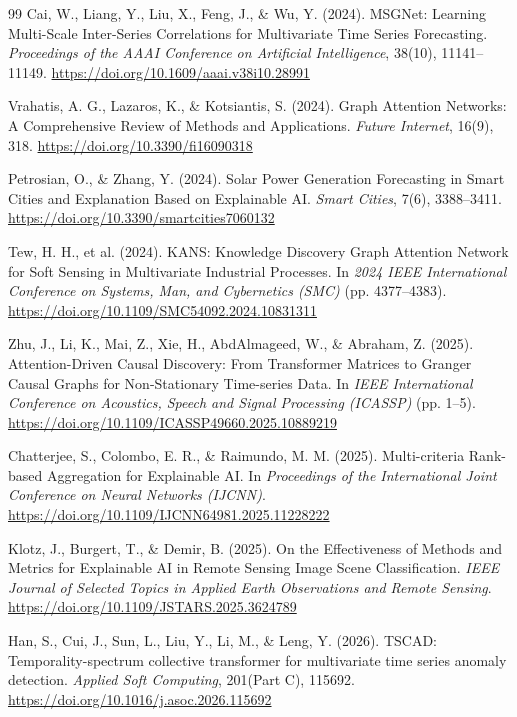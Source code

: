 \begin{thebibliography}{99}
 Cai, W., Liang, Y., Liu, X., Feng, J., \& Wu, Y. (2024). MSGNet: Learning Multi-Scale Inter-Series Correlations for Multivariate Time Series Forecasting. \emph{Proceedings of the AAAI Conference on Artificial Intelligence}, 38(10), 11141--11149. \url{https://doi.org/10.1609/aaai.v38i10.28991}

 Vrahatis, A. G., Lazaros, K., \& Kotsiantis, S. (2024). Graph Attention Networks: A Comprehensive Review of Methods and Applications. \emph{Future Internet}, 16(9), 318. \url{https://doi.org/10.3390/fi16090318}

 Petrosian, O., \& Zhang, Y. (2024). Solar Power Generation Forecasting in Smart Cities and Explanation Based on Explainable AI. \emph{Smart Cities}, 7(6), 3388--3411. \url{https://doi.org/10.3390/smartcities7060132}

 Tew, H. H., et al. (2024). KANS: Knowledge Discovery Graph Attention Network for Soft Sensing in Multivariate Industrial Processes. In \emph{2024 IEEE International Conference on Systems, Man, and Cybernetics (SMC)} (pp. 4377--4383). \url{https://doi.org/10.1109/SMC54092.2024.10831311}

 Zhu, J., Li, K., Mai, Z., Xie, H., AbdAlmageed, W., \& Abraham, Z. (2025). Attention-Driven Causal Discovery: From Transformer Matrices to Granger Causal Graphs for Non-Stationary Time-series Data. In \emph{IEEE International Conference on Acoustics, Speech and Signal Processing (ICASSP)} (pp. 1--5). \url{https://doi.org/10.1109/ICASSP49660.2025.10889219}

 Chatterjee, S., Colombo, E. R., \& Raimundo, M. M. (2025). Multi-criteria Rank-based Aggregation for Explainable AI. In \emph{Proceedings of the International Joint Conference on Neural Networks (IJCNN)}. \url{https://doi.org/10.1109/IJCNN64981.2025.11228222}

 Klotz, J., Burgert, T., \& Demir, B. (2025). On the Effectiveness of Methods and Metrics for Explainable AI in Remote Sensing Image Scene Classification. \emph{IEEE Journal of Selected Topics in Applied Earth Observations and Remote Sensing}. \url{https://doi.org/10.1109/JSTARS.2025.3624789}

 Han, S., Cui, J., Sun, L., Liu, Y., Li, M., \& Leng, Y. (2026). TSCAD: Temporality-spectrum collective transformer for multivariate time series anomaly detection. \emph{Applied Soft Computing}, 201(Part C), 115692. \url{https://doi.org/10.1016/j.asoc.2026.115692}


\end{thebibliography}
